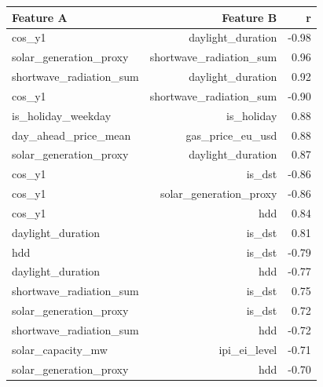 \begin{tabular}{lrr}
\toprule
Feature A & Feature B & r \\
\midrule
cos\_y1 & daylight\_duration & -0.98 \\
solar\_generation\_proxy & shortwave\_radiation\_sum & 0.96 \\
shortwave\_radiation\_sum & daylight\_duration & 0.92 \\
cos\_y1 & shortwave\_radiation\_sum & -0.90 \\
is\_holiday\_weekday & is\_holiday & 0.88 \\
day\_ahead\_price\_mean & gas\_price\_eu\_usd & 0.88 \\
solar\_generation\_proxy & daylight\_duration & 0.87 \\
cos\_y1 & is\_dst & -0.86 \\
cos\_y1 & solar\_generation\_proxy & -0.86 \\
cos\_y1 & hdd & 0.84 \\
daylight\_duration & is\_dst & 0.81 \\
hdd & is\_dst & -0.79 \\
daylight\_duration & hdd & -0.77 \\
shortwave\_radiation\_sum & is\_dst & 0.75 \\
solar\_generation\_proxy & is\_dst & 0.72 \\
shortwave\_radiation\_sum & hdd & -0.72 \\
solar\_capacity\_mw & ipi\_ei\_level & -0.71 \\
solar\_generation\_proxy & hdd & -0.70 \\
\bottomrule
\end{tabular}
